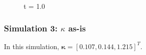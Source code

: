 \documentclass[paper=a4, fontsize=11pt]{scrartcl} %
\numberwithin{equation}{section} %
\numberwithin{figure}{section} %
\numberwithin{table}{section} %
\begin{document}
    \begin{figure}[H]
        \caption{t = 1.0}
        \label{fig:frame2_100}
    \end{figure}


\subsubsection{Simulation 3: $\kappa$ as-is}
In this simulation, $\bm{\kappa} = [0.107, 0.144, 1.215 ]^T$.
\end{document}
